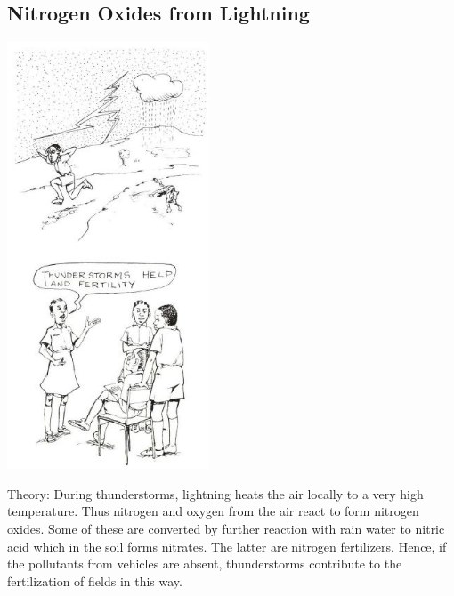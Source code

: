\begin{multicols}{2}
\subsection{Nitrogen Oxides from Lightning}

\begin{center}
\includegraphics[width=0.45\textwidth]{./img/source/nitrogen-lightning.jpg}
\end{center}

\begin{description*}
\item[Theory:]{During thunderstorms, lightning heats
the air locally to a very high temperature. Thus
nitrogen and oxygen from the air react to form
nitrogen oxides. Some of these are converted by
further reaction with rain water to nitric acid
which in the soil forms nitrates. The latter are
nitrogen fertilizers. Hence, if the pollutants
from vehicles are absent,
thunderstorms contribute to the fertilization of
fields in this way.}
\end{description*}


\end{multicols}
